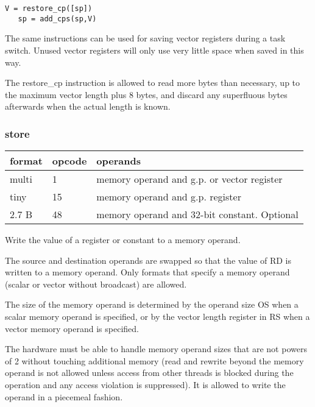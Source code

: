 \documentclass[forwardcom.tex]{subfiles}
\begin{document}
\begin{lstlisting}[frame=none]
   V = restore_cp([sp])
   sp = add_cps(sp,V)
\end{lstlisting}

The same instructions can be used for saving vector registers during a task switch. Unused vector registers will only use very little space when saved in this way.
\vspace{2mm}

The restore\_cp instruction is allowed to read more bytes than necessary, up to the maximum vector length plus 8 bytes, and discard any superfluous bytes afterwards when the actual length is known.


\subsubsection{store}
\label{table:storeInstruction}
\begin{tabular}{|p{12mm}|p{12mm}|p{110mm}|}
\hline
\bfseries format & \bfseries opcode & \bfseries operands \\ \hline
multi &  1 & memory operand and g.p. or vector register \\ \hline
tiny  & 15 & memory operand and g.p. register \\ \hline
2.7 B & 48 & memory operand and 32-bit constant. Optional \\ \hline
\end{tabular}
\vspace{2mm}

Write the value of a register or constant to a memory operand.
\vspace{2mm}

The source and destination operands are swapped so that the value of RD is written to a memory operand. Only formats that specify a memory operand (scalar or vector without broadcast) are allowed.
\vspace{2mm}

The size of the memory operand is determined by the operand size OS when a scalar memory operand is specified, or by the vector length register in RS when a vector memory operand is specified.
\vspace{2mm}

The hardware must be able to handle memory operand sizes that are not powers of 2 without touching additional memory (read and rewrite beyond the memory operand is not allowed unless access from other threads is blocked during the operation and any access violation is suppressed). It is allowed to write the operand in a piecemeal fashion.
\vspace{2mm}
\end{document}
